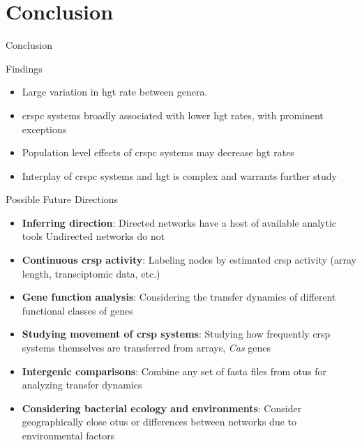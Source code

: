 \documentclass[dvipsnames]{beamer}
\begin{document}
\section{Conclusion}
\begin{frame}[fragile]{}%
    \begin{center}
        \Huge \textcolor{OliveGreen}{Conclusion}
    \end{center}
    \addtocounter{framenumber}{-1}
\end{frame}
\begin{frame}[fragile]{Findings}
    \begin{itemize}
        \item<2-> Large variation in \ac{hgt} rate between genera.
        \item<3-> \ac{crspc} systems broadly associated with lower \ac{hgt} rates, with prominent exceptions
        \item<4-> Population level effects of \ac{crspc} systems may decrease \ac{hgt} rates
        \item<5-> Interplay of \ac{crspc} systems  and \ac{hgt} is complex and warrants further study
    \end{itemize}
\end{frame}
\begin{frame}[fragile]{Possible Future Directions}
\begin{itemize}
    \item<2-> \textbf{Inferring direction}: Directed networks have a host of available analytic tools Undirected networks do not
    \item<3-> \textbf{Continuous \ac{crsp} activity}: Labeling nodes by estimated \ac{crsp} activity (array length, transciptomic data, etc.)
    \item<4-> \textbf{Gene function analysis}: Considering the transfer dynamics of different functional classes of genes
    \item<5-> \textbf{Studying movement of \ac{crsp} systems}: Studying how frequently \ac{crsp} systems themselves are transferred from arrays, \textit{Cas} genes
    \item<6-> \textbf{Intergenic comparisons}: Combine any set of fasta files from \ac{otu}s for analyzing transfer dynamics
    \item<7-> \textbf{Considering bacterial ecology and environments}: Consider geographically close \ac{otu}s or differences between networks due to environmental factors
\end{itemize}
\end{frame}
\end{document}
